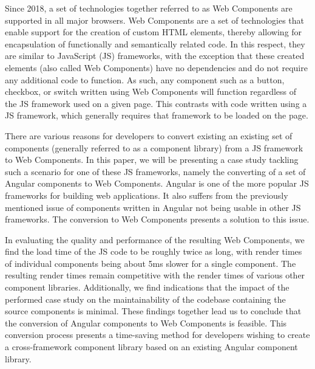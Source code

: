 Since 2018, a set of technologies together referred to as Web Components are supported in all major browsers. Web Components are a set of technologies that enable support for the creation of custom HTML elements, thereby allowing for encapsulation of functionally and semantically related code. In this respect, they are similar to JavaScript (JS) frameworks, with the exception that these created elements (also called Web Components) have no dependencies and do not require any additional code to function. As such, any component such as a button, checkbox, or switch written using Web Components will function regardless of the JS framework used on a given page. This contrasts with code written using a JS framework, which generally requires that framework to be loaded on the page.

There are various reasons for developers to convert existing an existing set of components (generally referred to as a component library) from a JS framework to Web Components. In this paper, we will be presenting a case study tackling such a scenario for one of these JS frameworks, namely the converting of a set of Angular components to Web Components. Angular is one of the more popular JS frameworks for building web applications. It also suffers from the previously mentioned issue of components written in Angular not being usable in other JS frameworks. The conversion to Web Components presents a solution to this issue.

In evaluating the quality and performance of the resulting Web Components, we find the load time of the JS code to be roughly twice as long, with render times of individual components being about 5ms slower for a single component. The resulting render times remain competitive with the render times of various other component libraries. Additionally, we find indications that the impact of the performed case study on the maintainability of the codebase containing the source components is minimal. These findings together lead us to conclude that the conversion of Angular components to Web Components is feasible. This conversion process presents a time-saving method for developers wishing to create a cross-framework component library based on an existing Angular component library.